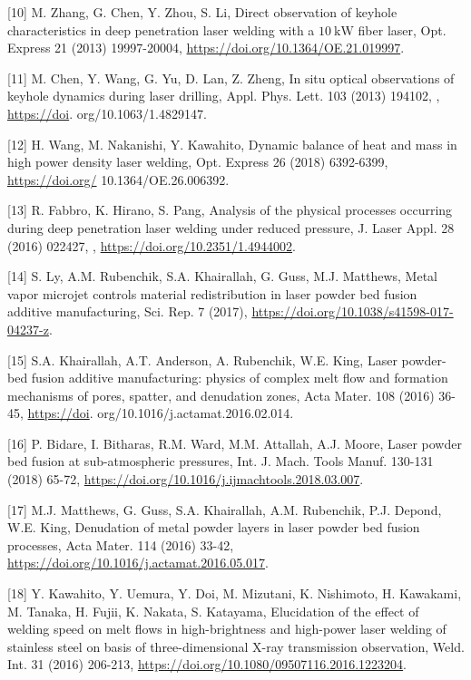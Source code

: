 \documentclass[10pt]{article}
\begin{document}
[10] M. Zhang, G. Chen, Y. Zhou, S. Li, Direct observation of keyhole characteristics in deep penetration laser welding with a $10 \mathrm{~kW}$ fiber laser, Opt. Express 21 (2013) 19997-20004, \href{https://doi.org/10.1364/OE.21.019997}{https://doi.org/10.1364/OE.21.019997}.

[11] M. Chen, Y. Wang, G. Yu, D. Lan, Z. Zheng, In situ optical observations of keyhole dynamics during laser drilling, Appl. Phys. Lett. 103 (2013) 194102, , \href{https://doi}{https://doi}. org/10.1063/1.4829147.

[12] H. Wang, M. Nakanishi, Y. Kawahito, Dynamic balance of heat and mass in high power density laser welding, Opt. Express 26 (2018) 6392-6399, \href{https://doi.org/}{https://doi.org/} 10.1364/OE.26.006392.

[13] R. Fabbro, K. Hirano, S. Pang, Analysis of the physical processes occurring during deep penetration laser welding under reduced pressure, J. Laser Appl. 28 (2016) 022427, , \href{https://doi.org/10.2351/1.4944002}{https://doi.org/10.2351/1.4944002}.

[14] S. Ly, A.M. Rubenchik, S.A. Khairallah, G. Guss, M.J. Matthews, Metal vapor microjet controls material redistribution in laser powder bed fusion additive manufacturing, Sci. Rep. 7 (2017), \href{https://doi.org/10.1038/s41598-017-04237-z}{https://doi.org/10.1038/s41598-017-04237-z}.

[15] S.A. Khairallah, A.T. Anderson, A. Rubenchik, W.E. King, Laser powder-bed fusion additive manufacturing: physics of complex melt flow and formation mechanisms of pores, spatter, and denudation zones, Acta Mater. 108 (2016) 36-45, \href{https://doi}{https://doi}. org/10.1016/j.actamat.2016.02.014.

[16] P. Bidare, I. Bitharas, R.M. Ward, M.M. Attallah, A.J. Moore, Laser powder bed fusion at sub-atmospheric pressures, Int. J. Mach. Tools Manuf. 130-131 (2018) 65-72, \href{https://doi.org/10.1016/j.ijmachtools.2018.03.007}{https://doi.org/10.1016/j.ijmachtools.2018.03.007}.

[17] M.J. Matthews, G. Guss, S.A. Khairallah, A.M. Rubenchik, P.J. Depond, W.E. King, Denudation of metal powder layers in laser powder bed fusion processes, Acta Mater. 114 (2016) 33-42, \href{https://doi.org/10.1016/j.actamat.2016.05.017}{https://doi.org/10.1016/j.actamat.2016.05.017}.

[18] Y. Kawahito, Y. Uemura, Y. Doi, M. Mizutani, K. Nishimoto, H. Kawakami, M. Tanaka, H. Fujii, K. Nakata, S. Katayama, Elucidation of the effect of welding speed on melt flows in high-brightness and high-power laser welding of stainless steel on basis of three-dimensional X-ray transmission observation, Weld. Int. 31 (2016) 206-213, \href{https://doi.org/10.1080/09507116.2016.1223204}{https://doi.org/10.1080/09507116.2016.1223204}.
\end{document}
